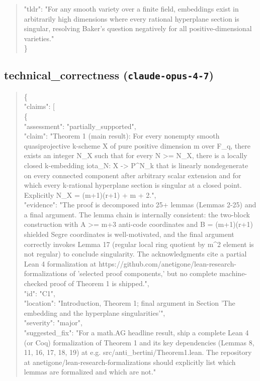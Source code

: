 \documentclass[11pt]{article}
\begin{document}
\begin{quote}
  "tldr": "For any smooth variety over a finite field, embeddings exist in arbitrarily high dimensions where every rational hyperplane section is singular, resolving Baker's question negatively for all positive-dimensional varieties."\\
\}\\
\end{quote}

\subsection*{technical\_correctness (\texttt{claude-opus-4-7})}
\begin{quote}\small\ttfamily\raggedright
\{\\
  "claims": [\\
    \{\\
      "assessment": "partially\_supported",\\
      "claim": "Theorem 1 (main result): For every nonempty smooth quasiprojective k-scheme X of pure positive dimension m over F\_q, there exists an integer N\_X such that for every N >= N\_X, there is a locally closed k-embedding iota\_N: X -> P\^{}N\_k that is linearly nondegenerate on every connected component after arbitrary scalar extension and for which every k-rational hyperplane section is singular at a closed point. Explicitly N\_X = (m+1)(r+1) + m + 2.",\\
      "evidence": "The proof is decomposed into 25+ lemmas (Lemmas 2-25) and a final argument. The lemma chain is internally consistent: the two-block construction with A >= m+3 anti-code coordinates and B = (m+1)(r+1) shielded Segre coordinates is well-motivated, and the final argument correctly invokes Lemma 17 (regular local ring quotient by m\^{}2 element is not regular) to conclude singularity. The acknowledgments cite a partial Lean 4 formalization at https://github.com/anetigone/lean-research-formalizations of 'selected proof components,' but no complete machine-checked proof of Theorem 1 is shipped.",\\
      "id": "C1",\\
      "location": "Introduction, Theorem 1; final argument in Section 'The embedding and the hyperplane singularities'",\\
      "severity": "major",\\
      "suggested\_fix": "For a math.AG headline result, ship a complete Lean 4 (or Coq) formalization of Theorem 1 and its key dependencies (Lemmas 8, 11, 16, 17, 18, 19) at e.g. src/anti\_bertini/Theorem1.lean. The repository at anetigone/lean-research-formalizations should explicitly list which lemmas are formalized and which are not."\\

\end{quote}
\end{document}
